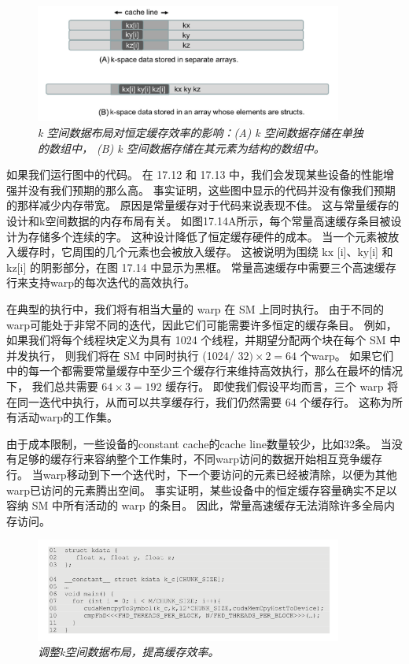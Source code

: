 \begin{figure}[H]
	\centering
	\includegraphics[width=0.9\textwidth]{figs/F17.14.png}
	\caption{\textit{k 空间数据布局对恒定缓存效率的影响：(A) k 空间数据存储在单独的数组中，
	(B) k 空间数据存储在其元素为结构的数组中。}}
\end{figure}

如果我们运行图中的代码。 在 17.12 和 17.13 中，我们会发现某些设备的性能增强并没有我们预期的那么高。 
事实证明，这些图中显示的代码并没有像我们预期的那样减少内存带宽。 原因是常量缓存对于代码来说表现不佳。 
这与常量缓存的设计和k空间数据的内存布局有关。 如图17.14A所示，每个常量高速缓存条目被设计为存储多个连续的字。 
这种设计降低了恒定缓存硬件的成本。 当一个元素被放入缓存时，它周围的几个元素也会被放入缓存。 
这被说明为围绕 $\mathrm{kx}$ [i]、ky[i] 和 kz[i] 的阴影部分，在图 17.14 中显示为黑框。 
常量高速缓存中需要三个高速缓存行来支持warp的每次迭代的高效执行。

在典型的执行中，我们将有相当大量的 warp 在 SM 上同时执行。 
由于不同的warp可能处于非常不同的迭代，因此它们可能需要许多恒定的缓存条目。 
例如，如果我们将每个线程块定义为具有 1024 个线程，并期望分配两个块在每个 SM 中并发执行，
则我们将在 SM 中同时执行 (1024/ $32) \times 2=64$ 个warp。 
如果它们中的每一个都需要常量缓存中至少三个缓存行来维持高效执行，那么在最坏的情况下，
我们总共需要 $64 \times 3=192$ 缓存行。 
即使我们假设平均而言，三个 warp 将在同一迭代中执行，从而可以共享缓存行，我们仍然需要 64 个缓存行。 
这称为所有活动warp的工作集。

由于成本限制，一些设备的constant cache的cache line数量较少，比如32条。 
当没有足够的缓存行来容纳整个工作集时，不同warp访问的数据开始相互竞争缓存行。 
当warp移动到下一个迭代时，下一个要访问的元素已经被清除，以便为其他warp已访问的元素腾出空间。 
事实证明，某些设备中的恒定缓存容量确实不足以容纳 SM 中所有活动的 warp 的条目。 
因此，常量高速缓存无法消除许多全局内存访问。

\begin{figure}[H]
	\centering
	\includegraphics[width=0.9\textwidth]{figs/F17.15.png}
	\caption{\textit{调整k空间数据布局，提高缓存效率。}}
\end{figure}

